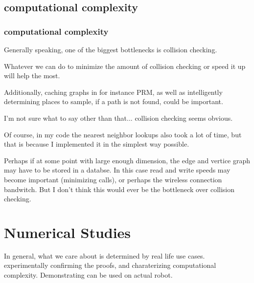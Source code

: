 \documentclass[a4paper]{article}
\begin{document}
\subsection{computational complexity}

\subsubsection{computational complexity}

Generally speaking, one of the biggest bottlenecks is collision checking.

Whatever we can do to minimize the amount of collision checking or speed it up
    will help the most.

Additionally, caching graphs in for instance PRM, as well as intelligently
    determining places to sample, if a path is not found, could be important.

I'm not sure what to say other than that... collision checking seems obvious.

Of course, in my code the nearest neighbor lookups also took a lot of time, but
that is because I implemented it in the simplest way possible.

Perhaps if at some point with large enough dimension, the edge and vertice graph may have
    to be stored in a databse. In this case read and write speeds may become
    important (minimizing calls), or perhaps the wireless connection bandwitch.
    But I don't think this would ever be the bottleneck over collision
    checking.

\section{Numerical Studies}

In general, what we care about is determined by real life use cases.
    experimentally confirming the proofs, and charaterizing computational
    complexity. Demonstrating can be used on actual robot.
\end{document}

